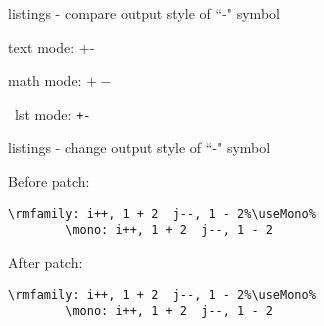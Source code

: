 \documentclass{article}
\begin{document}
\begin{example}{listings - compare output style of ``-" symbol}
  \newfontfamily{}
  \mono
  
  text mode: +-    \par
  math mode: $+-$  \par
  \ lst mode: \lstinline|+-|
\end{example}

\begin{example}{listings - change output style of ``-" symbol}
  \newfontfamily{}
  
  \makeatletter
  \def\useMono{\lst@AddToHook{OnNewLine}{\mono}}
  \def\useRoman{\gdef\lsthk@OnNewLine{\rmfamily}} %
  \makeatother
  
  Before patch:
  \begin{lstlisting}[escapechar=\%]
    \rmfamily: i++, 1 + 2  j--, 1 - 2%\useMono%
        \mono: i++, 1 + 2  j--, 1 - 2
  \end{lstlisting}

  \makeatletter
  \lst@CCPutMacro
      \@empty\z@\@empty
  \makeatother
  
  \useRoman
  After patch:
  \begin{lstlisting}[escapechar=\%]
    \rmfamily: i++, 1 + 2  j--, 1 - 2%\useMono%
        \mono: i++, 1 + 2  j--, 1 - 2
  \end{lstlisting}
\end{example}
\end{document}
